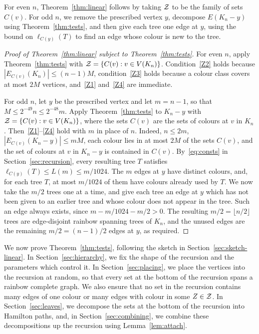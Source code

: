 For even $n$, Theorem~\ref{thm:linear} follows by taking $\mathcal{Z}$ to be the family of sets $C(v)$.
For odd $n$, we remove the prescribed vertex $y$, decompose $E(K_n-y)$ using Theorem~\ref{thm:tests}, and then give each tree one edge at $y$, using the bound on $\ell_{C(y)}(T)$ to find an edge whose colour is new to the tree.

\begin{proof}[Proof of Theorem~\ref{thm:linear} subject to Theorem~\ref{thm:tests}]
For even $n$, apply Theorem~\ref{thm:tests} with $\mathcal{Z}=\{C(v):v\in V(K_n)\}$. Condition~\ref{Z2} holds because $|E_{C(v)}(K_n)|\le(n-1)M$, condition~\ref{Z3} holds because a colour class covers at most $2M$ vertices, and~\ref{Z1} and~\ref{Z4} are immediate.

For odd $n$, let $y$ be the prescribed vertex and let $m=n-1$, so that $M\le2^{-49}n\le2^{-48}m$.
Apply Theorem~\ref{thm:tests} to $K_n-y$ with $\mathcal{Z}=\{C(v):v\in V(K_n)\}$, where the sets $C(v)$ are the sets of colours at $v$ in $K_n$.
Then~\ref{Z1}--\ref{Z4} hold with $m$ in place of $n$. Indeed, $n\le 2m$, $|E_{C(v)}(K_n-y)|\le mM$, each colour lies in at most $2M$ of the sets $C(v)$, and the set of colours at $v$ in $K_n-y$ is contained in $C(v)$.
By~\eqref{eq:consts} in Section~\ref{sec:recursion}, every resulting tree $T$ satisfies $\ell_{C(y)}(T)\le L(m)\le m/1024$.
The $m$ edges at $y$ have distinct colours, and, for each tree $T$, at most $m/1024$ of them have colours already used by $T$.
We now take the $m/2$ trees one at a time, and give each tree an edge at $y$ which has not been given to an earlier tree and whose colour does not appear in the tree. Such an edge always exists, since $m-m/1024-m/2>0$.
The resulting $m/2=\lfloor n/2\rfloor$ trees are edge-disjoint rainbow spanning trees of $K_n$, and the unused edges are the remaining $m/2=(n-1)/2$ edges at $y$, as required.
\end{proof}

We now prove Theorem~\ref{thm:tests}, following the sketch in Section~\ref{sec:sketch-linear}.
In Section~\ref{sec:hierarchy}, we fix the shape of the recursion and the parameters which control it.
In Section~\ref{sec:placing}, we place the vertices into the recursion at random, so that every set at the bottom of the recursion spans a rainbow complete graph. We also ensure that no set in the recursion contains many edges of one colour or many edges with colour in some $Z\in\mathcal{Z}$.
In Section~\ref{sec:leaves}, we decompose the sets at the bottom of the recursion into Hamilton paths, and, in Section~\ref{sec:combining}, we combine these decompositions up the recursion using Lemma~\ref{lem:attach}.

